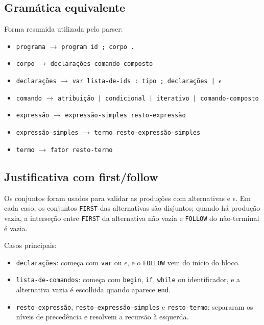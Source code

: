 \documentclass[12pt,a4paper]{article}
\begin{document}
\subsection*{Gramática equivalente}

Forma resumida utilizada pelo parser:

\begin{itemize}[leftmargin=1.5em]
    \item \texttt{programa} \(\rightarrow\) \texttt{program id ; corpo .}
    \item \texttt{corpo} \(\rightarrow\) \texttt{declarações comando-composto}
    \item \texttt{declarações} \(\rightarrow\) \texttt{var lista-de-ids : tipo ; declarações | \(\epsilon\)}
    \item \texttt{comando} \(\rightarrow\) \texttt{atribuição | condicional | iterativo | comando-composto}
    \item \texttt{expressão} \(\rightarrow\) \texttt{expressão-simples resto-expressão}
    \item \texttt{expressão-simples} \(\rightarrow\) \texttt{termo resto-expressão-simples}
    \item \texttt{termo} \(\rightarrow\) \texttt{fator resto-termo}
\end{itemize}

\subsection*{Justificativa com first/follow}

Os conjuntos foram usados para validar as produções com alternativas e \(\epsilon\). Em cada caso, os conjuntos \texttt{FIRST} das alternativas são disjuntos; quando há produção vazia, a interseção entre \texttt{FIRST} da alternativa não vazia e \texttt{FOLLOW} do não-terminal é vazia.

Casos principais:

\begin{itemize}[leftmargin=1.5em]
    \item \texttt{declarações}: começa com \texttt{var} ou \(\epsilon\), e o \texttt{FOLLOW} vem do início do bloco.
    \item \texttt{lista-de-comandos}: começa com \texttt{begin}, \texttt{if}, \texttt{while} ou identificador, e a alternativa vazia é escolhida quando aparece \texttt{end}.
    \item \texttt{resto-expressão}, \texttt{resto-expressão-simples} e \texttt{resto-termo}: separaram os níveis de precedência e resolvem a recursão à esquerda.
\end{itemize}
\end{document}
